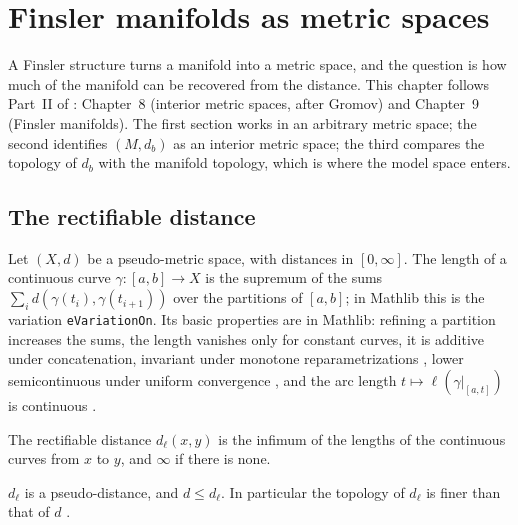 \chapter{Finsler manifolds as metric spaces}
\label{chap:metric-spaces}

A Finsler structure turns a manifold into a metric space, and the question is how much of the
manifold can be recovered from the distance. This chapter follows Part~II of \cite{Lar22}:
Chapter~8 (interior metric spaces, after Gromov) and Chapter~9 (Finsler manifolds). The first
section works in an arbitrary metric space; the second identifies $(M, d_b)$ as an interior
metric space; the third compares the topology of $d_b$ with the manifold topology, which is where
the model space enters.

\section{The rectifiable distance}
\label{sec:ms-rectifiable}

Let $(X, d)$ be a pseudo-metric space, with distances in $[0, \infty]$. The length of a continuous
curve $\gamma \colon [a, b] \to X$ is the supremum of the sums
$\sum_i d(\gamma(t_i), \gamma(t_{i+1}))$ over the partitions of $[a, b]$; in Mathlib this is the
variation \texttt{eVariationOn}. Its basic properties are in Mathlib: refining a partition
increases the sums, the length vanishes only for constant curves, it is additive under
concatenation, invariant under monotone reparametrizations \cite[Obs.~8.1.1]{Lar22}, lower
semicontinuous under uniform convergence \cite[Prop.~8.1.3]{Lar22}, and the arc length
$t \mapsto \ell(\gamma|_{[a, t]})$ is continuous \cite[Lema~8.1.4]{Lar22}.

\begin{definition}
  \label{def:ms-length-dist}
  \leanok
  The rectifiable distance $d_\ell(x, y)$ is the infimum of the lengths of the continuous curves
  from $x$ to $y$, and $\infty$ if there is none.
\end{definition}

\begin{proposition}
  \label{prop:ms-length-dist}
  \leanok
  $d_\ell$ is a pseudo-distance, and $d \leq d_\ell$. In particular the topology of $d_\ell$ is
  finer than that of $d$ \cite[Obs.~8.1.7]{Lar22}.
\end{proposition}

